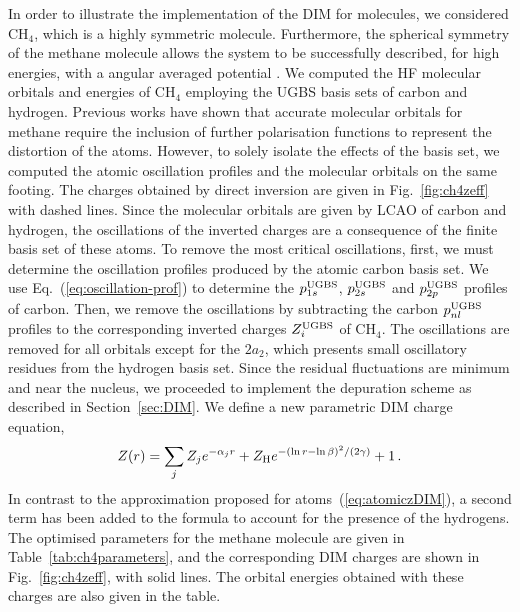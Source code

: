 \documentclass[10pt]{article}
\begin{document}
In order to illustrate the implementation of the DIM for molecules, 
we considered CH$_4$, which is a highly symmetric 
molecule. Furthermore, the spherical symmetry of the methane molecule
allows the system to be successfully described, for high energies, 
with a angular averaged potential \cite{Granados2016}.
We computed the HF molecular orbitals and energies of CH$_4$ employing 
the UGBS basis sets of carbon and hydrogen. Previous works 
\cite{Rothenberg1971,Hariharan1972} have shown that accurate molecular 
orbitals for methane require the inclusion of further polarisation 
functions to represent the distortion of the atoms. However, to solely 
isolate the effects of the basis set, we computed the atomic oscillation 
profiles and the molecular orbitals on the same footing. 
The charges obtained by direct inversion are given in 
Fig.~\ref{fig:ch4zeff} with dashed lines. 
Since the molecular orbitals are given by LCAO of carbon and 
hydrogen, the oscillations of the inverted charges are a 
consequence of the finite basis set of these atoms. 
To remove the most critical oscillations,  first, we must 
determine the oscillation profiles produced by the atomic carbon basis set.
We use Eq.~(\ref{eq:oscillation-prof}) to determine the 
$p_{1s}^{\mbox{\scriptsize UGBS}}$, $p_{2s}^{\mbox{\scriptsize UGBS}}$ 
and $p_{2p}^{\mbox{\scriptsize UGBS}}$ profiles of carbon. 
Then, we remove the oscillations by 
subtracting the carbon $p_{nl}^{\mbox{\scriptsize UGBS}}$ profiles 
to the corresponding inverted charges 
$Z_{i}^{\mbox{\scriptsize UGBS}}$ of CH$_4$.
The oscillations are removed for all orbitals except for the 
$2a_2$, which presents small oscillatory residues from the 
hydrogen basis set. Since the residual fluctuations are minimum
and near the nucleus, we proceeded to implement the depuration 
scheme as described in Section~\ref{sec:DIM}. We define a new 
parametric DIM charge equation,
\begin{eqnarray}
 Z(r) = \sum_j Z_j e^{-\alpha_j r} 
 + Z_{\mbox{\scriptsize H}} e^{-(\ln r - \ln \beta)^2/(2\gamma)} 
 + 1\,.
 \label{eq:moleculezDIM}
\end{eqnarray}
In contrast to the approximation proposed for 
atoms~(\ref{eq:atomiczDIM}), a second term has been added to the 
formula to account for the presence of the hydrogens.
The optimised parameters for the methane molecule are given in 
Table~\ref{tab:ch4parameters}, and the corresponding DIM 
charges are shown in Fig.~\ref{fig:ch4zeff}, with solid lines. 
The orbital energies obtained with these charges are also given in 
the table.
\end{document}
